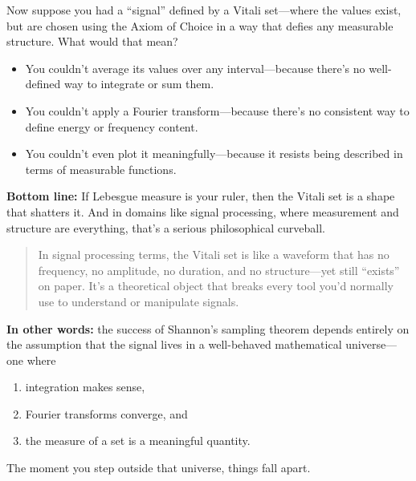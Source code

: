Now suppose you had a “signal” defined by a Vitali set—where the values exist, but are chosen using the Axiom of Choice in a way that defies any measurable structure. What would that mean?

\begin{itemize}
  \item You couldn’t average its values over any interval—because there's no well-defined way to integrate or sum them.
  \item You couldn’t apply a Fourier transform—because there’s no consistent way to define energy or frequency content.
  \item You couldn’t even plot it meaningfully—because it resists being described in terms of measurable functions.
\end{itemize}

\textbf{Bottom line:} If Lebesgue measure is your ruler, then the Vitali set is a shape that shatters it. And in domains like signal processing, where measurement and structure are everything, that’s a serious philosophical curveball.


\begin{quote}
In signal processing terms, the Vitali set is like a waveform that has no frequency, no amplitude, no duration, and no structure—yet still “exists” on paper. It’s a theoretical object that breaks every tool you’d normally use to understand or manipulate signals.
\end{quote}


\textbf{In other words:} the success of Shannon's sampling theorem depends entirely on the assumption that the signal lives in a well-behaved mathematical universe—one where 

\begin{enumerate}
	\item integration makes sense, 
	\item Fourier transforms converge, and 
	\item the measure of a set is a meaningful quantity. 
\end{enumerate}

The moment you step outside that universe, things fall apart.






